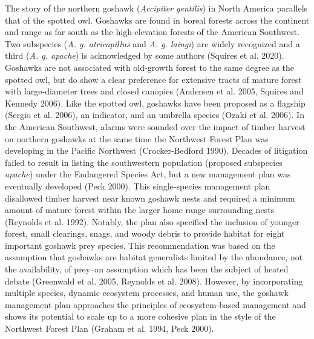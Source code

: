 \documentclass{sfuthesis}
\begin{document}
The story of the northern goshawk (\emph{Accipiter gentilis}) in North America parallels that of the spotted owl. Goshawks are found in boreal forests across the continent and range as far south as the high-elevation forests of the American Southwest. Two subspecies (\emph{A. g. atricapillus} and \emph{A. g. laingi}) are widely recognized and a third (\emph{A. g. apache}) is acknowledged by some authors (Squires et al. 2020). Goshawks are not associated with old-growth forest to the same degree as the spotted owl, but do show a clear preference for extensive tracts of mature forest with large-diameter trees and closed canopies (Andersen et al. 2005, Squires and Kennedy 2006). Like the spotted owl, goshawks have been proposed as a flagship (Sergio et al. 2006), an indicator, and an umbrella species (Ozaki et al. 2006). In the American Southwest, alarms were sounded over the impact of timber harvest on northern goshawks at the same time the Northwest Forest Plan was developing in the Pacific Northwest (Crocker-Bedford 1990). Decades of litigation failed to result in listing the southwestern population (proposed subspecies \emph{apache}) under the Endangered Species Act, but a new management plan was eventually developed (Peck 2000). This single-species management plan disallowed timber harvest near known goshawk nests and required a minimum amount of mature forest within the larger home range surrounding nests (Reynolds et al. 1992). Notably, the plan also specified the inclusion of younger forest, small clearings, snags, and woody debris to provide habitat for eight important goshawk prey species. This recommendation was based on the assumption that goshawks are habitat generalists limited by the abundance, not the availability, of prey--an assumption which has been the subject of heated debate (Greenwald et al. 2005, Reynolds et al. 2008). However, by incorporating multiple species, dynamic ecosystem processes, and human use, the goshawk management plan approaches the principles of ecosystem-based management and shows its potential to scale up to a more cohesive plan in the style of the Northwest Forest Plan (Graham et al. 1994, Peck 2000).
\end{document}
